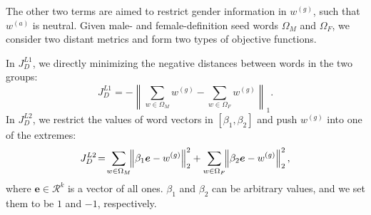 The other two terms are aimed to restrict gender information in $w^{(g)}$, such that  $w^{(a)}$ is neutral.  Given male- and female-definition seed words $\Omega_M$ and $\Omega_F$, 
we consider two distant metrics and form two types of objective functions.

In $J_D^{L1}$, we directly minimizing the negative distances between words in the two groups: 
$$J_D^{L1} = - \left\|\sum_{w\in \Omega_M} w^{(g)}  - \sum_{w\in \Omega_F} w^{(g)}\right\|_1. $$
In $J_D^{L2}$, we restrict the values of word vectors in $[\beta_1, \beta_2]$ and push $w^{(g)}$ into one of the extremes:
\begin{equation*}
    J_D^{L2} \!=\! \sum_{w\in \Omega_M}\!\!\left\|\beta_1 \bm{e} - w^{(g)}\right\|_2^2 + \sum_{w \in \Omega_F}\!\!\left\| \beta_2\bm{e} - w^{(g)}\right\|_2^2,
    \vspace{-3pt}
\end{equation*}
where $\bm{e} \in \mathcal{R}^{k}$ is a vector of all ones.
 $\beta_1$ and $\beta_2$ can be arbitrary values, and we set them to be $1$ and $-1$, respectively.

